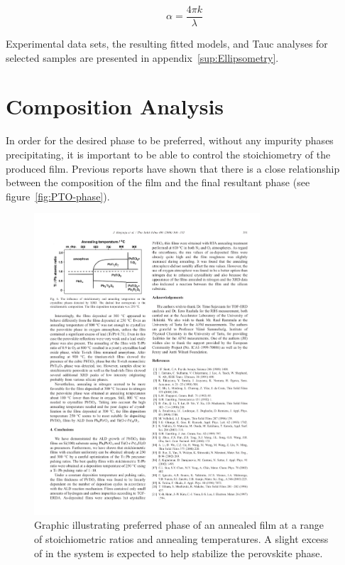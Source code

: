 \begin{equation}
	\label{eq:alpha}%
	\alpha = \frac{4\pi k}{\lambda}
\end{equation}

Experimental data sets, the resulting fitted models, and Tauc analyses for selected samples are presented in appendix~\vref{sup:Ellipsometry}.


\section{Composition Analysis}
\label{sec:Methods-Comp}

In order for the desired phase to be preferred, without any impurity phases precipitating, it is important to be able to control the stoichiometry of the produced film. Previous reports have shown that there is a close relationship between the composition of the film and the final resultant phase (see figure~\vref{fig:PTO-phase}).\cite{harjuoja_2006} 

\begin{figure}[tb]
   \centering
   \includegraphics[width=0.75\textwidth]{./figures/dataanalysis/PTO-phase}
   \caption[Preferred Phase vs. Stoichiometric Ratio]{Graphic illustrating preferred phase of an annealed %
   		film at a range of stoichiometric ratios and annealing temperatures. A slight excess of  %
		in the system is expected to help stabilize the perovskite \PTO{} phase.\cite{harjuoja_2006}}
   \label{fig:PTO-phase}
\end{figure}

